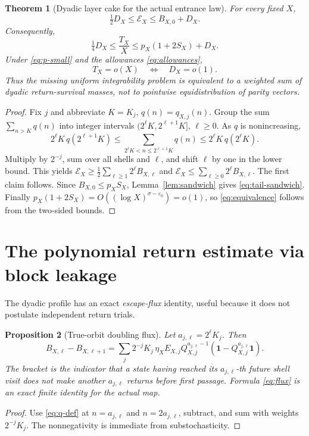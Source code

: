 \documentclass[11pt,a4paper]{article}
\newtheorem{theorem}{Theorem}
\newtheorem{proposition}[theorem]{Proposition}
\theoremstyle{remark}
\newcommand{\one}{\mathbf 1}
\newcommand{\Ex}{\mathcal E}
\begin{document}
\begin{theorem}[Dyadic layer cake for the actual entrance law]\label{thm:dyadic}
For every fixed $X$,
\begin{equation}\label{eq:layer-cake}
\boxed{\qquad \tfrac12D_X\le\Ex_X\le B_{X,0}+D_X.\qquad}
\end{equation}
Consequently,
\begin{equation}\label{eq:tail-sandwich}
\boxed{\qquad \tfrac14D_X\le \frac{T_X}{X}
\le p_X(1+2S_X)+D_X.\qquad}
\end{equation}
Under \eqref{eq:p-small} and the allowances \eqref{eq:allowances},
\begin{equation}\label{eq:equivalence}
\boxed{\qquad T_X=o(X)\quad\Longleftrightarrow\quad D_X=o(1).\qquad}
\end{equation}
Thus the missing uniform integrability problem is equivalent to a
\emph{weighted sum of dyadic return-survival masses}, not to
pointwise equidistribution of parity vectors.
\end{theorem}
\begin{proof}
Fix $j$ and abbreviate $K=K_j$, $q(n)=q_{X,j}(n)$.
Group the sum $\sum_{n>K}q(n)$ into integer intervals
$(2^\ell K,2^{\ell+1}K]$, $\ell\ge0$.  As $q$ is nonincreasing,
\[
2^\ell K\,q(2^{\ell+1}K)
\le\sum_{2^\ell K<n\le2^{\ell+1}K}q(n)
\le2^\ell K\,q(2^\ell K).
\]
Multiply by $2^{-j}$, sum over all shells and $\ell$, and shift
$\ell$ by one in the lower bound.  This yields
$\Ex_X\ge\frac12\sum_{\ell\ge1}2^\ell B_{X,\ell}$ and
$\Ex_X\le\sum_{\ell\ge0}2^\ell B_{X,\ell}$.
The first claim follows.  Since $B_{X,0}\le p_X S_X$,
Lemma~\ref{lem:sandwich} gives \eqref{eq:tail-sandwich}.
Finally $p_X(1+2S_X)=O((\log X)^{\sigma-\varepsilon_0})=o(1)$,
so \eqref{eq:equivalence} follows from the two-sided bounds.
\end{proof}

\section{The polynomial return estimate via block leakage}
The dyadic profile has an exact \emph{escape-flux} identity, useful
because it does not postulate independent return trials.

\begin{proposition}[True-orbit doubling flux]\label{prop:flux}
Let $a_{j,\ell}=2^\ell K_j$.  Then
\begin{equation}\label{eq:flux}
\boxed{\quad B_{X,\ell}-B_{X,\ell+1}
=\sum_j 2^{-j}K_j\,\eta_XE_{X,j}Q_{X,j}^{a_{j,\ell}-1}
       (\one-Q_{X,j}^{a_{j,\ell}}\one).\quad}
\end{equation}
The bracket is the indicator that a state having reached its
$a_{j,\ell}$-th future shell visit does \emph{not} make another
$a_{j,\ell}$ returns before first passage.  Formula
\eqref{eq:flux} is an exact finite identity for the actual map.
\end{proposition}
\begin{proof}
Use \eqref{eq:q-def} at $n=a_{j,\ell}$ and
$n=2a_{j,\ell}$, subtract, and sum with weights $2^{-j}K_j$.
The nonnegativity is immediate from substochasticity.
\end{proof}
\end{document}
